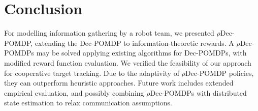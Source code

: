 \section{Conclusion}
\label{sec:conclusion}
For modelling information gathering by a robot team, we presented $\rho$Dec-POMDP, extending the Dec-POMDP to information-theoretic rewards.
A $\rho$Dec-POMDPs may be solved applying existing algorithms for Dec-POMDPs, with modified reward function evaluation.
We verified the feasibility of our approach for cooperative target tracking.
Due to the adaptivity of $\rho$Dec-POMDP policies, they can outperform heuristic approaches.
Future work includes extended empirical evaluation, and possibly combining $\rho$Dec-POMDPs with distributed state estimation to relax communication assumptions.